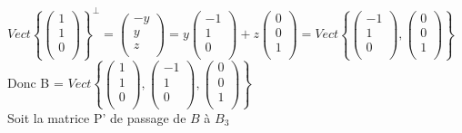 \documentclass{article}
\begin{document}
$Vect\left\{\begin{pmatrix}
    1\\
    1\\
    0\\
\end{pmatrix}\right\}^\perp = \begin{pmatrix}
    -y\\
    y\\
    z\\
\end{pmatrix} = y\begin{pmatrix}
    -1\\
    1\\
    0\\
\end{pmatrix} + z \begin{pmatrix}
    0\\
    0\\
    1\\
\end{pmatrix} = Vect\left\{\begin{pmatrix}
    -1\\
    1\\
    0\\
\end{pmatrix}, \begin{pmatrix}
    0\\
    0\\
    1\\
\end{pmatrix}\right\}$\\
Donc B = $Vect\left\{\begin{pmatrix}
    1\\
    1\\
    0\\
\end{pmatrix},\begin{pmatrix}
    -1\\
    1\\
    0\\
\end{pmatrix}, \begin{pmatrix}
    0\\
    0\\
    1\\
\end{pmatrix}\right\}$ \vspace{2mm}\\
Soit la matrice P' de passage de $B$ à $B_3$\\
\end{document}
